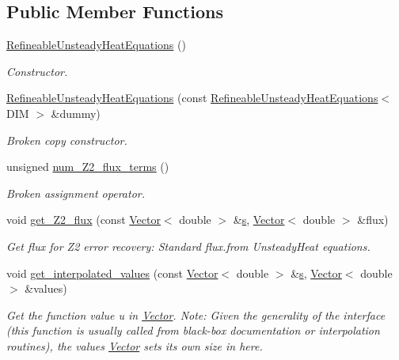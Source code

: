 \subsection*{Public Member Functions}
\begin{DoxyCompactItemize}
\item 
\hyperlink{classoomph_1_1RefineableUnsteadyHeatEquations_a288d73b971d6c891ef0061e4f0af1efd}{Refineable\+Unsteady\+Heat\+Equations} ()
\begin{DoxyCompactList}\small\item\em Constructor. \end{DoxyCompactList}\item 
\hyperlink{classoomph_1_1RefineableUnsteadyHeatEquations_a0692ca0fa838216345e368058a4c10cd}{Refineable\+Unsteady\+Heat\+Equations} (const \hyperlink{classoomph_1_1RefineableUnsteadyHeatEquations}{Refineable\+Unsteady\+Heat\+Equations}$<$ D\+IM $>$ \&dummy)
\begin{DoxyCompactList}\small\item\em Broken copy constructor. \end{DoxyCompactList}\item 
unsigned \hyperlink{classoomph_1_1RefineableUnsteadyHeatEquations_acb105ac90a3d3f5c2887f3073db8782b}{num\+\_\+\+Z2\+\_\+flux\+\_\+terms} ()
\begin{DoxyCompactList}\small\item\em Broken assignment operator. \end{DoxyCompactList}\item 
void \hyperlink{classoomph_1_1RefineableUnsteadyHeatEquations_a971fdad8f46d54dcc140a57f5b46c05c}{get\+\_\+\+Z2\+\_\+flux} (const \hyperlink{classoomph_1_1Vector}{Vector}$<$ double $>$ \&\hyperlink{cfortran_8h_ab7123126e4885ef647dd9c6e3807a21c}{s}, \hyperlink{classoomph_1_1Vector}{Vector}$<$ double $>$ \&flux)
\begin{DoxyCompactList}\small\item\em Get \textquotesingle{}flux\textquotesingle{} for Z2 error recovery\+: Standard flux.\+from Unsteady\+Heat equations. \end{DoxyCompactList}\item 
void \hyperlink{classoomph_1_1RefineableUnsteadyHeatEquations_a0363c6a60754b66ac9393ba2f8e18d2b}{get\+\_\+interpolated\+\_\+values} (const \hyperlink{classoomph_1_1Vector}{Vector}$<$ double $>$ \&\hyperlink{cfortran_8h_ab7123126e4885ef647dd9c6e3807a21c}{s}, \hyperlink{classoomph_1_1Vector}{Vector}$<$ double $>$ \&values)
\begin{DoxyCompactList}\small\item\em Get the function value u in \hyperlink{classoomph_1_1Vector}{Vector}. Note\+: Given the generality of the interface (this function is usually called from black-\/box documentation or interpolation routines), the values \hyperlink{classoomph_1_1Vector}{Vector} sets its own size in here. \end{DoxyCompactList}\item 

\end{DoxyCompactItemize}
